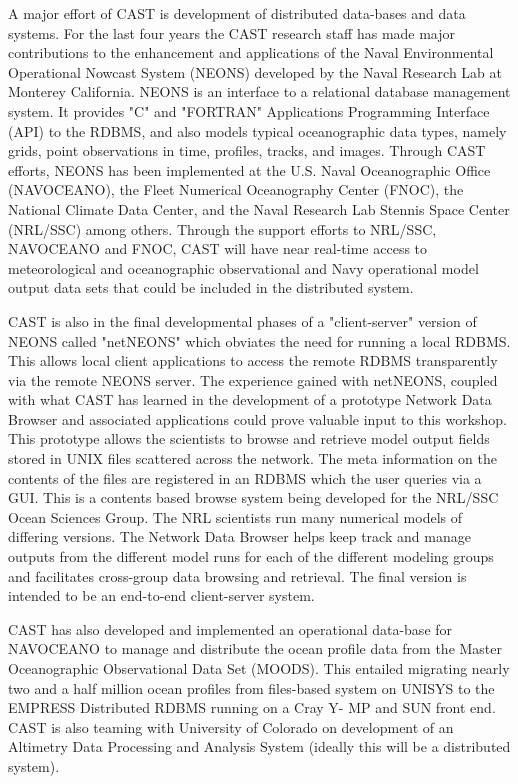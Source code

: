 \medskip
\large
{}
\normalsize
\medskip

	A major effort of CAST is development of distributed data-bases 
and data systems.  For the last four years the CAST research staff has 
made major contributions to the enhancement and applications of the 
Naval Environmental Operational Nowcast System (NEONS) developed by 
the Naval Research Lab at Monterey California.  NEONS is an interface to a 
relational database management system.  It provides "C" and "FORTRAN" 
Applications Programming Interface (API) to the RDBMS, and also models 
typical oceanographic data types, namely grids, point observations in 
time, profiles, tracks, and images.  Through CAST efforts, NEONS has been 
implemented at the U.S. Naval Oceanographic Office (NAVOCEANO), the 
Fleet Numerical Oceanography Center (FNOC), the National Climate Data 
Center, and the Naval Research Lab Stennis Space Center (NRL/SSC) among 
others.  Through the support efforts to NRL/SSC, NAVOCEANO and FNOC, 
CAST will have near real-time access to meteorological and 
oceanographic observational and Navy operational model output data sets 
that could be included in the distributed system.

	CAST is also in the final developmental phases of a "client-server" 
version of NEONS called "netNEONS" which obviates the need for running a 
local RDBMS.  This allows local client applications to access the remote 
RDBMS transparently via the remote NEONS server.  The experience gained 
with netNEONS, coupled with what CAST has learned in the development of 
a prototype Network Data Browser and associated applications could prove 
valuable input to this workshop.  This prototype allows the scientists to 
browse and retrieve model output fields stored in UNIX files scattered 
across the network.  The meta information on the contents of the files are 
registered in an RDBMS which the user queries via a GUI.  This is a 
contents based browse system being developed for the NRL/SSC Ocean 
Sciences Group.  The NRL scientists run many numerical models of 
differing versions.  The Network Data Browser helps keep track and 
manage outputs from the different model runs for each of the different 
modeling groups and facilitates cross-group data browsing and retrieval.  
The final version is intended to be an end-to-end client-server system.

	CAST has also developed and implemented an operational data-base 
for NAVOCEANO to manage and distribute the ocean profile data from the 
Master Oceanographic Observational Data Set (MOODS). This entailed 
migrating nearly two and a half million ocean profiles from files-based 
system on UNISYS to the EMPRESS Distributed RDBMS running on a Cray Y-
MP and SUN front end.  CAST is also teaming with University of Colorado 
on development of an Altimetry Data Processing and Analysis System 
(ideally this will be a distributed system).
\newpage

